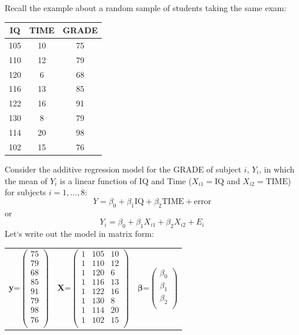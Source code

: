 Recall the example about a random sample of students taking the same exam:
\begin{center}
\begin{tabular}{|c|c|c|} \hline
IQ & TIME & GRADE \\ \hline
105 & 10 & 75 \\
110 & 12 & 79 \\
120 & 6 & 68 \\
116 & 13 & 85 \\
122 & 16 & 91 \\
130 & 8 & 79 \\
114 & 20 & 98 \\
102 & 15 & 76 \\ \hline
\end{tabular}
\end{center}
\noindent
Consider the additive regression model for the GRADE of 
subject $i$, $Y_i$, in which the mean of $Y_i$ is a linear function of IQ and Time ($X_{i1}=\mbox{IQ}$ and $X_{i2}=\mbox{TIME}$) for subjects $i=1,\ldots,8$:
$$ Y = \beta_0 + \beta_1 \mbox{IQ} + \beta_2 \mbox{TIME} + \mbox{error}$$ 
or
$$ Y_i = \beta_0 + \beta_1 X_{i1} + \beta_2 X_{i2} + E_{i} $$ 
Let`s write out the model in matrix form:
\begin{center}
\begin{tabular}{ccc}
\textbf{y}=$\left(\begin{array}{c} 75 \\79\\68\\85\\91\\79\\98\\76\\\end{array}\right)$ &
\textbf{X}=$\left(\begin{array}{ccc}
1  &  105  &   10  \\
1  &  110  &   12  \\
1  &  120  &    6  \\
1  &  116  &   13  \\
1  &  122  &   16  \\
1  &  130  &    8  \\
1  &  114  &   20  \\
1  &  102  &   15  \\
\end{array}\right)$&
$\boldsymbol{\beta}$=$\left(\begin{array}{c} \beta_0 \\\beta_1\\\beta_2\\\end{array}\right)$ 
\end{tabular}
\end{center}

